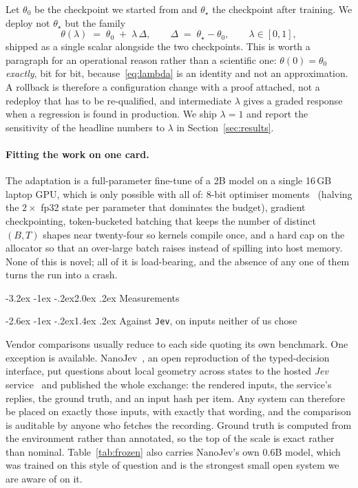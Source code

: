 \documentclass[11pt]{article}
\makeatletter
\renewcommand\section{\@startsection{section}{1}{\z@}%
  {-3.2ex \@plus -1ex \@minus -.2ex}{2.0ex \@plus.2ex}%
  {\normalfont\large\bfseries\color{accent}}}
\renewcommand\subsection{\@startsection{subsection}{2}{\z@}%
  {-2.6ex \@plus -1ex \@minus -.2ex}{1.4ex \@plus.2ex}%
  {\normalfont\normalsize\bfseries\color{accent!85!black}}}
\newcommand{\1}{\mathbf{1}}
\makeatother
\begin{document}
Let $\theta_0$ be the checkpoint we started from and $\theta_\star$ the checkpoint after training.
We deploy not $\theta_\star$ but the family
\begin{equation}
\theta(\lambda) \;=\; \theta_0 \;+\; \lambda\,\Delta,
\qquad \Delta \;=\; \theta_\star - \theta_0,
\qquad \lambda \in [0, 1],
\label{eq:lambda}
\end{equation}
shipped as a single scalar alongside the two checkpoints. This is worth a paragraph for an
operational reason rather than a scientific one: $\theta(0) = \theta_0$ \emph{exactly}, bit for bit,
because~\eqref{eq:lambda} is an identity and not an approximation. A rollback is therefore a
configuration change with a proof attached, not a redeploy that has to be re-qualified, and
intermediate $\lambda$ gives a graded response when a regression is found in production. We ship
$\lambda = 1$ and report the sensitivity of the headline numbers to $\lambda$ in
Section~\ref{sec:results}.

\paragraph{Fitting the work on one card.} The adaptation is a full-parameter fine-tune of a 2B model
on a single 16\,GB laptop GPU, which is only possible with all of: 8-bit optimiser moments~\cite{dettmers2022optimizers} (halving
the $2\times$ fp32 state per parameter that dominates the budget), gradient checkpointing,
token-bucketed batching that keeps the number of distinct $(B, T)$ shapes near twenty-four so
kernels compile once, and a hard cap on the allocator so that an over-large batch raises instead of
spilling into host memory. None of this is novel; all of it is load-bearing, and the absence of any
one of them turns the run into a crash.

\section{Measurements}
\label{sec:results}

\subsection{Against \texttt{Jev}, on inputs neither of us chose}

Vendor comparisons usually reduce to each side quoting its own benchmark. One exception is
available. NanoJev~\cite{nanojev2026}, an open reproduction of the typed-decision interface, put
\frozenN{} questions about local geometry across \frozenStates{} states to the hosted \emph{Jev}
service~\cite{almeida2026systemone} and published the
whole exchange: the rendered inputs, the service's replies, the ground truth, and an input hash per
item. Any system can therefore be placed on exactly those inputs, with exactly that wording, and the
comparison is auditable by anyone who fetches the recording. Ground truth is computed from the
environment rather than annotated, so the top of the scale is exact rather than nominal.
Table~\ref{tab:frozen} also carries NanoJev's own 0.6B model, which was trained on this style of
question and is the strongest small open system we are aware of on it.
\end{document}

